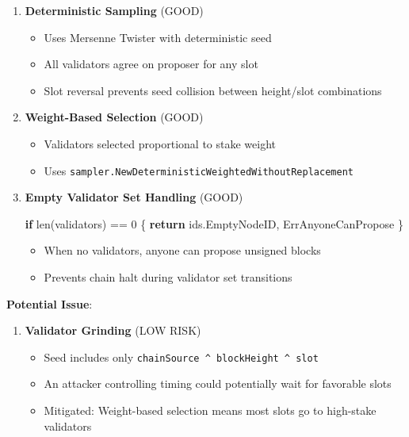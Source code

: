 \documentclass[
]{article}
\newenvironment{Shaded}{}{}
\newcommand{\BuiltInTok}[1]{\textcolor[rgb]{0.00,0.50,0.00}{#1}}
\newcommand{\ControlFlowTok}[1]{\textcolor[rgb]{0.00,0.44,0.13}{\textbf{#1}}}
\newcommand{\DecValTok}[1]{\textcolor[rgb]{0.25,0.63,0.44}{#1}}
\newcommand{\NormalTok}[1]{#1}
\newcommand{\OperatorTok}[1]{\textcolor[rgb]{0.40,0.40,0.40}{#1}}
\providecommand{\tightlist}{%
  \setlength{\itemsep}{0pt}\setlength{\parskip}{0pt}}
\begin{document}
\begin{enumerate}
\def\labelenumi{\arabic{enumi}.}
\item
  \textbf{Deterministic Sampling} (GOOD)

  \begin{itemize}
  \tightlist
  \item
    Uses Mersenne Twister with deterministic seed
  \item
    All validators agree on proposer for any slot
  \item
    Slot reversal prevents seed collision between height/slot
    combinations
  \end{itemize}
\item
  \textbf{Weight-Based Selection} (GOOD)

  \begin{itemize}
  \tightlist
  \item
    Validators selected proportional to stake weight
  \item
    Uses \texttt{sampler.NewDeterministicWeightedWithoutReplacement}
  \end{itemize}
\item
  \textbf{Empty Validator Set Handling} (GOOD)

\begin{Shaded}
\begin{Highlighting}[]
\ControlFlowTok{if} \BuiltInTok{len}\OperatorTok{(}\NormalTok{validators}\OperatorTok{)} \OperatorTok{==} \DecValTok{0} \OperatorTok{\{}
    \ControlFlowTok{return}\NormalTok{ ids}\OperatorTok{.}\NormalTok{EmptyNodeID}\OperatorTok{,}\NormalTok{ ErrAnyoneCanPropose}
\OperatorTok{\}}
\end{Highlighting}
\end{Shaded}

  \begin{itemize}
  \tightlist
  \item
    When no validators, anyone can propose unsigned blocks
  \item
    Prevents chain halt during validator set transitions
  \end{itemize}
\end{enumerate}

\textbf{Potential Issue}:

\begin{enumerate}
\def\labelenumi{\arabic{enumi}.}
\tightlist
\item
  \textbf{Validator Grinding} (LOW RISK)

  \begin{itemize}
  \tightlist
  \item
    Seed includes only
    \texttt{chainSource\ \^{}\ blockHeight\ \^{}\ slot}
  \item
    An attacker controlling timing could potentially wait for favorable
    slots
  \item
    Mitigated: Weight-based selection means most slots go to high-stake
    validators
  \end{itemize}
\end{enumerate}
\end{document}
